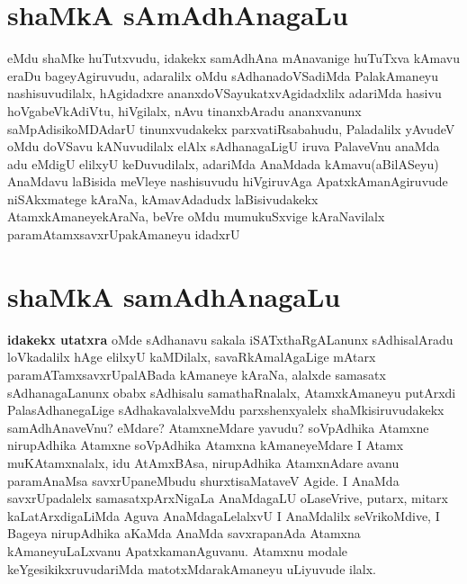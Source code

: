 \section*{shaMkA sAmAdhAnagaLu}
\begin{artha}
eMdu shaMke huTutxvudu, idakekx samAdhAna mAnavanige huTuTxva kAmavu eraDu bageyAgiruvudu, adaralilx oMdu sAdhanadoVSadiMda PalakAmaneyu nashisuvudilalx, hAgidadxre ananxdoVSayukatxvAgidadxlilx adariMda hasivu hoVgabeVkAdiVtu, hiVgilalx, nAvu tinanxbAradu ananxvanunx saMpAdisikoMDAdarU tinunxvudakekx parxvatiRsabahudu, Paladalilx yAvudeV oMdu doVSavu kANuvudilalx elAlx sAdhanagaLigU iruva PalaveVnu anaMda adu eMdigU elilxyU keDuvudilalx, adariMda AnaMdada kAmavu(aBilASeyu) AnaMdavu laBisida meVleye nashisuvudu hiVgiruvAga ApatxkAmanAgiruvude niSAkxmatege kAraNa, kAmavAdadudx laBisivudakekx AtamxkAmaneyekAraNa, beVre oMdu mumukuSxvige kAraNavilalx paramAtamxsavxrUpakAmaneyu idadxrU  
\end{artha}

\section*{shaMkA samAdhAnagaLu} 

\begin{artha}
\textbf{idakekx utatxra} oMde sAdhanavu sakala iSATxthaRgALanunx sAdhisalAradu loVkadalilx hAge elilxyU kaMDilalx, savaRkAmalAgaLige mAtarx paramATamxsavxrUpalABada kAmaneye kAraNa, alalxde samasatx sAdhanagaLanunx obabx sAdhisalu samathaRnalalx, AtamxkAmaneyu putArxdi PalasAdhanegaLige sAdhakavalalxveMdu parxshenxyalelx shaMkisiruvudakekx samAdhAnaveVnu? eMdare? AtamxneMdare yavudu? soVpAdhika Atamxne nirupAdhika Atamxne soVpAdhika Atamxna kAmaneyeMdare I Atamx muKAtamxnalalx, idu AtAmxBAsa, nirupAdhika AtamxnAdare avanu paramAnaMsa savxrUpaneMbudu shurxtisaMataveV Agide. I AnaMda savxrUpadalelx samasatxpArxNigaLa AnaMdagaLU oLaseVrive, putarx, mitarx kaLatArxdigaLiMda Aguva AnaMdagaLelalxvU I AnaMdalilx seVrikoMdive, I Bageya nirupAdhika aKaMda AnaMda savxrapanAda Atamxna kAmaneyuLaLxvanu ApatxkamanAguvanu. Atamxnu modale keYgesikikxruvudariMda matotxMdarakAmaneyu uLiyuvude ilalx.
\end{artha}

